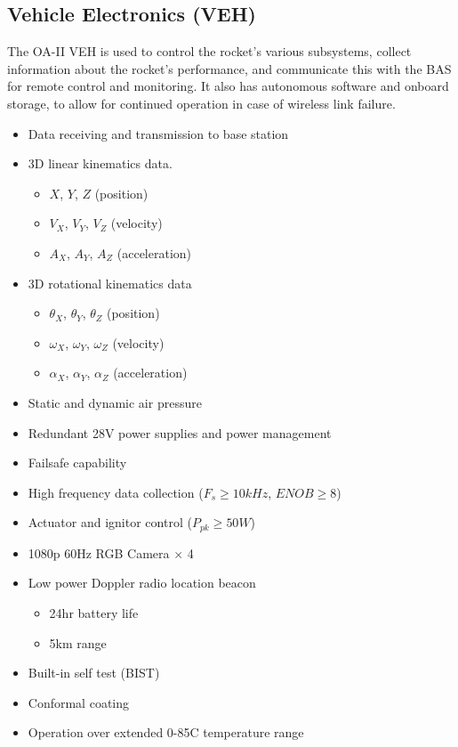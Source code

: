 \documentclass[12pt,article]{memoir}
\begin{document}
\subsection{Vehicle Electronics (VEH)}
The OA-II VEH is used to control the rocket's various subsystems, collect information about the rocket's performance, and communicate this with the BAS for remote control and monitoring. It also has autonomous software and onboard storage, to allow for continued operation in case of wireless link failure.
\begin{itemize}
	\item Data receiving and transmission to base station
	\item 3D linear kinematics data.
	\begin{itemize}
		\item $X$, $Y$, $Z$ (position)
		\item $V_X$, $V_Y$, $V_Z$ (velocity)
		\item $A_X$, $A_Y$, $A_Z$ (acceleration)
	\end{itemize}
	\item 3D rotational kinematics data
	\begin{itemize}
		\item $\theta_X$, $\theta_Y$, $\theta_Z$ (position)
		\item $\omega_X$, $\omega_Y$, $\omega_Z$ (velocity)
		\item $\alpha_X$, $\alpha_Y$, $\alpha_Z$ (acceleration)
	\end{itemize}
	\item Static and dynamic air pressure
	\item Redundant 28V power supplies and power management
	\item Failsafe capability
	\item High frequency data collection ($F_s \geq 10kHz$, $ENOB \geq 8$)
	\item Actuator and ignitor control ($P_{pk} \geq 50W$)
	\item 1080p 60Hz RGB Camera $\times$ 4
	\item Low power Doppler radio location beacon
	\begin{itemize}
		\item 24hr battery life
		\item 5km range
	\end{itemize}
	\item Built-in self test (BIST)
	\item Conformal coating
	\item Operation over extended 0-85\degree C temperature range
\end{itemize}
\end{document}
